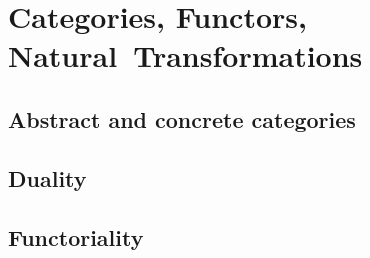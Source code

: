 \chapter{Categories, Functors, Natural~Transformations}

\section{Abstract and concrete categories}




\section{Duality}








\section{Functoriality}








